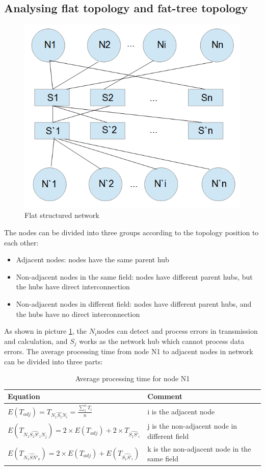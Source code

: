 \documentclass[11pt,openright,a4paper]{report}
\begin{document}
\subsection{Analysing flat topology and fat-tree topology}
\begin{figure}[H]
	\centering
    \includegraphics[width=0.4\linewidth]{picture/FlatStruct.PNG}
    \caption{Flat structured network}
    \label{fig:flat}
\end{figure}
The nodes can be divided into three groups according to the topology position to each other:
\begin{itemize}
	\item Adjacent nodes: nodes have the same parent hub
    \item Non-adjacent nodes in the same field: nodes have different parent hubs, but the hubs have direct interconnection
    \item Non-adjacent nodes in different field: nodes have different parent hubs, and the hubs have no direct interconnection
\end{itemize}
As shown in picture \ref{fig:flat}, the $N_{i}$nodes can detect and process errors in transmission and calculation, and $S_{j}$ works as the network hub which cannot process data errors. The average processing time from node N1 to adjacent nodes in network can be divided into three parts:\\
\begin{table}[H]
\centering
\caption{Average processing time for node N1}
\label{tab:n1proc}
\begin{tabular}{@{}ll@{}}
\toprule
Equation                                                                                          & Comment                                       \\ \midrule
$E(T_{adj})=T_{\widehat{N_{1}S_{1}N_{i}}}=\frac{\sum_{1}^{n}T_{i}}{n}$                            & i is the adjacent node                        \\
$E(T_{\widehat{N_{1}S_{1}{S}'_{1}N_{j}}})=2\times E(T_{adj})+2\times T_{\widehat{S_{1}{S}'_{i}}}$ & j is the non-adjacent node in different field  \\
$E(T_{\widehat{N_{1}S{N}'_{k}}})=2\times E(T_{adj})+E(T_{\widehat{S_{1}{S}'_{i}}})$          & k is the non-adjacent node in the same field \\ \bottomrule
\end{tabular}
\end{table}
\end{document}
